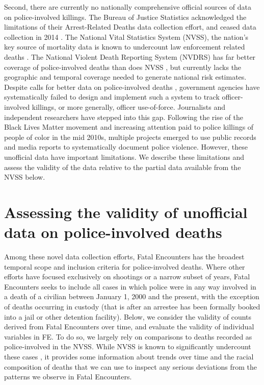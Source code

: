 \documentclass{article}
\begin{document}
Second, there are currently no nationally comprehensive official sources of data on police-involved killings. The Bureau of Justice Statistics acknowledged the limitations of their Arrest-Related Deaths data collection effort, and ceased data collection in 2014 \cite{banks2016arrest}. The National Vital Statistics System (NVSS), the nation's key source of mortality data is known to undercount law enforcement related deaths \cite{Feldman2017Quantifying}. The National Violent Death Reporting System (NVDRS) has far better coverage of police-involved deaths than does NVSS \cite{conner2019validating}, but currently lacks the geographic and temporal coverage needed to generate national risk estimates. Despite calls for better data on police-involved deaths \cite{Krieger2015Police}, government agencies have systematically failed to design and implement such a system to track officer-involved killings, or more generally, officer use-of-force. Journalists and independent researchers have stepped into this gap. Following the rise of the Black Lives Matter movement and increasing attention paid to police killings of people of color in the mid 2010s, multiple projects emerged to use public records and media reports to systematically document police violence. However, these unofficial data have important limitations. We describe these limitations and assess the validity of the data relative to the partial data available from the NVSS below.

\section*{Assessing the validity of unofficial data on police-involved deaths}

Among these novel data collection efforts, Fatal Encounters has the broadest temporal scope and inclusion criteria for police-involved deaths. Where other efforts have focused exclusively on shootings or a narrow subset of years, Fatal Encounters seeks to include all cases in which police were in any way involved in a death of a civilian between January 1, 2000 and the present, with the exception of deaths occurring in custody (that is after an arrestee has been formally booked into a jail or other detention facility). Below, we consider the validity of counts derived from Fatal Encounters over time, and evaluate the validity of individual variables in FE. To do so, we largely rely on comparisons to deaths recorded as police-involved in the NVSS. While NVSS is known to significantly undercount these cases \cite{Feldman2017Quantifying}, it provides some information about trends over time and the racial composition of deaths that we can use to inspect any serious deviations from the patterns we observe in Fatal Encounters.
\end{document}
